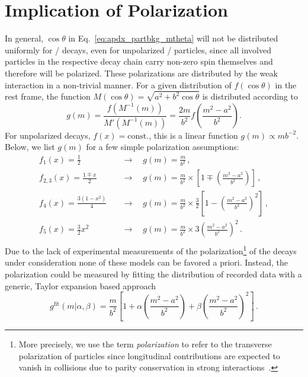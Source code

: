 \section{Implication of Polarization}
In general, $\cos \theta$ in Eq.~\eqref{eq:apdx_partbkg_mtheta} will not be distributed uniformly for \Lb / \Xibz decays, even for unpolarized \Lb / \Xibz particles, since all involved particles in the respective decay chain carry non-zero spin themselves and therefore will be polarized.
These polarizations are distributed by the weak interaction in a non-trivial manner.
For a given distribution of $f(\cos \theta)$ in the \Lb rest frame, the function $M(\cos \theta) = \sqrt{a^2 + b^2 \cos \theta}$ is distributed according to 
\begin{equation*}
    g(m) = \frac{f \! \left(M^{-1}(m) \right)}{M' \! \left(M^{-1}(m) \right)} = \frac{2m}{b^2} f \! \left( \frac{m^2 - a^2}{b^2} \right).
\end{equation*}
For unpolarized decays, $f(x) = \text{const.}$, this is a linear function $g(m) \propto m b^{-2}$.
Below, we list $g(m)$ for a few simple polarization assumptions:
\begin{align*}
    f_1(x) = \frac{1}{2} & \quad \rightarrow \quad g(m) = \frac{m}{b^2} \,, \\
    f_{2,3}(x) = \frac{1 \mp x}{2} & \quad \rightarrow \quad g(m) = \frac{m}{b^2} \times \left[ 1 \mp \left( \frac{m^2 - a^2}{b^2} \right) \right] \,, \\
    f_4(x) = \frac{3(1-x^2)}{4} & \quad \rightarrow \quad g(m) = \frac{m}{b^2} \times \frac{3}{2} \left[ 1 - \left( \frac{m^2 - a^2}{b^2} \right)^2 \right] \,, \\
    f_5(x) = \frac{3}{2} x^2 & \quad \rightarrow \quad g(m) = \frac{m}{b^2} \times 3 \left( \frac{m^2 - a^2}{b^2} \right)^2 \,. \\
\end{align*}
Due to the lack of experimental measurements of the polarization\footnote{More precisely, we use the term \textit{polarization} to refer to the transverse polarization of particles since longitudinal contributions are expected to vanish in \proton\proton collisions due to parity conservation in strong interactions~\cite{LbDecaysIntoLzVector}.} of the decays under consideration none of these models can be favored a priori.
Instead, the polarization could be measured by fitting the distribution of recorded data with a generic, Taylor expansion based approach
\begin{equation*}
    g^\mathrm{fit}(m|\alpha, \beta) = \frac{m}{b^2} \left[ 1 + \alpha \left( \frac{m^2 - a^2}{b^2} \right) + \beta \left( \frac{m^2 - a^2}{b^2} \right)^2 \right] \,.
\end{equation*}
